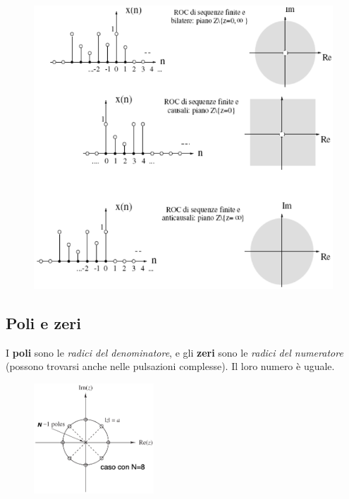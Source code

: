 \begin{figure}[h]
	\centering
	\includegraphics[scale=0.45]{Lezioni/Immagini/roc}
\end{figure}

\newpage
\subsection{Poli e zeri}
I \textbf{poli} sono le \textit{radici del denominatore}, e gli \textbf{zeri} sono le \textit{radici del numeratore} (possono trovarsi anche nelle pulsazioni complesse). Il loro numero è uguale.

 \begin{figure}
 	\includegraphics[width=0.4\textwidth]{Lezioni/Immagini/circonferenza}
 	\vspace{-40pt}
 \end{figure}

